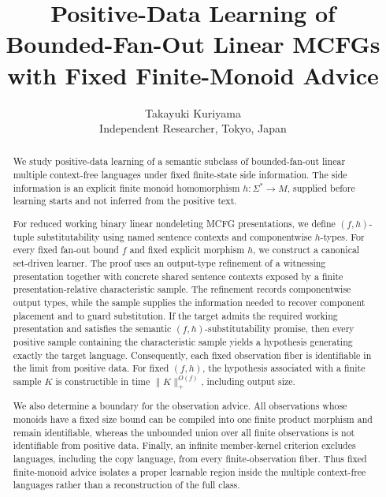 \documentclass[11pt,a4paper]{article}
\title{Positive-Data Learning of Bounded-Fan-Out Linear MCFGs with Fixed Finite-Monoid Advice}
\author{Takayuki Kuriyama\\Independent Researcher, Tokyo, Japan}
\date{}
\theoremstyle{remark}
\begin{document}
\setlength{\abovedisplayskip}{6pt plus 2pt minus 3pt}
\setlength{\belowdisplayskip}{6pt plus 2pt minus 3pt}
\setlength{\abovedisplayshortskip}{3pt plus 1pt minus 2pt}
\setlength{\belowdisplayshortskip}{3pt plus 1pt minus 2pt}
\maketitle



\begin{abstract}
We study positive-data learning of a semantic subclass of bounded-fan-out
linear multiple context-free languages under fixed finite-state side
information.  The side information is an explicit finite monoid homomorphism
\(h:\Sigma^*\to M\), supplied before learning starts and not inferred from the
positive text.

For reduced working binary linear nondeleting MCFG presentations, we define
\((f,h)\)-tuple substitutability using named sentence contexts and
componentwise \(h\)-types.  For every fixed fan-out bound \(f\) and fixed
explicit morphism \(h\), we construct a canonical set-driven learner.  The
proof uses an output-type refinement of a witnessing presentation together
with concrete shared sentence contexts exposed by a finite
presentation-relative characteristic sample.  The refinement records
componentwise output types, while the sample supplies the information needed
to recover component placement and to guard substitution.  If the target admits
the required working presentation and satisfies the semantic
\((f,h)\)-substitutability promise, then every positive sample containing the
characteristic sample yields a hypothesis generating exactly the target
language.  Consequently, each fixed observation fiber is identifiable in the
limit from positive data.  For fixed \((f,h)\), the hypothesis associated with
a finite sample \(K\) is constructible in time \(\|K\|_+^{O(f)}\), including
output size.

We also determine a boundary for the observation advice.  All observations
whose monoids have a fixed size bound can be compiled into one finite product
morphism and remain identifiable, whereas the unbounded union over all finite
observations is not identifiable from positive data.  Finally, an infinite
member-kernel criterion excludes languages, including the copy language, from
every finite-observation fiber.  Thus fixed finite-monoid advice isolates a
proper learnable region inside the multiple context-free languages rather than
a reconstruction of the full class.
\end{abstract}
\end{document}

